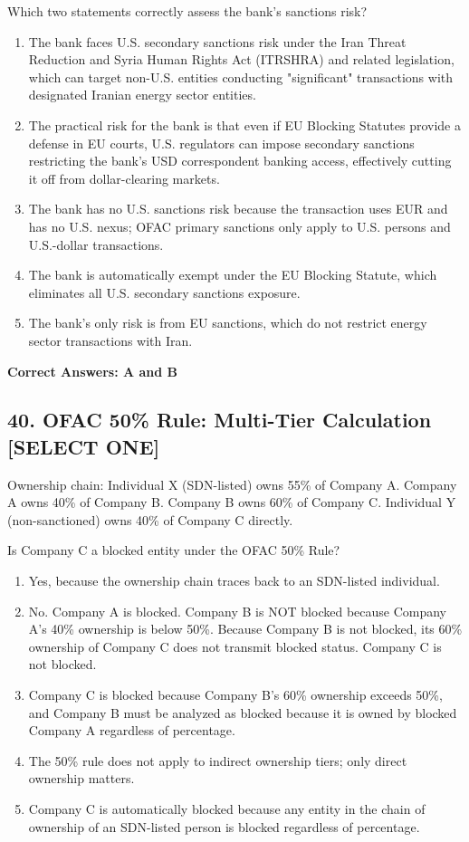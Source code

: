 \documentclass[11pt,a4paper]{article}
\begin{document}
	Which two statements correctly assess the bank's sanctions risk?
	
	\begin{enumerate}[label=\Alph*.]
		\item The bank faces U.S. secondary sanctions risk under the Iran Threat Reduction and Syria Human Rights Act (ITRSHRA) and related legislation, which can target non-U.S. entities conducting "significant" transactions with designated Iranian energy sector entities.
		\item The practical risk for the bank is that even if EU Blocking Statutes provide a defense in EU courts, U.S. regulators can impose secondary sanctions restricting the bank's USD correspondent banking access, effectively cutting it off from dollar-clearing markets.
		\item The bank has no U.S. sanctions risk because the transaction uses EUR and has no U.S. nexus; OFAC primary sanctions only apply to U.S. persons and U.S.-dollar transactions.
		\item The bank is automatically exempt under the EU Blocking Statute, which eliminates all U.S. secondary sanctions exposure.
		\item The bank's only risk is from EU sanctions, which do not restrict energy sector transactions with Iran.
	\end{enumerate}
	
	\textbf{Correct Answers: A and B}
	
	\subsection{40. OFAC 50\% Rule: Multi-Tier Calculation \textnormal{[SELECT ONE]}}
	
	Ownership chain: Individual X (SDN-listed) owns 55\% of Company A. Company A owns 40\% of Company B. Company B owns 60\% of Company C. Individual Y (non-sanctioned) owns 40\% of Company C directly.
	
	Is Company C a blocked entity under the OFAC 50\% Rule?
	
	\begin{enumerate}[label=\Alph*.]
		\item Yes, because the ownership chain traces back to an SDN-listed individual.
		\item No. Company A is blocked. Company B is NOT blocked because Company A's 40\% ownership is below 50\%. Because Company B is not blocked, its 60\% ownership of Company C does not transmit blocked status. Company C is not blocked.
		\item Company C is blocked because Company B's 60\% ownership exceeds 50\%, and Company B must be analyzed as blocked because it is owned by blocked Company A regardless of percentage.
		\item The 50\% rule does not apply to indirect ownership tiers; only direct ownership matters.
		\item Company C is automatically blocked because any entity in the chain of ownership of an SDN-listed person is blocked regardless of percentage.
	\end{enumerate}
	
\end{document}
